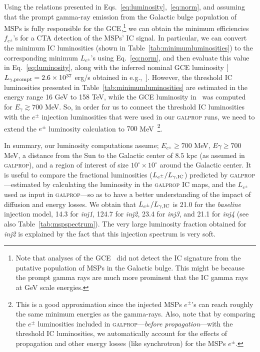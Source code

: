 \documentclass[doublespace,nopageskip]{VTthesis}
\begin{document}
 Using the relations presented in Eqs.~\ref{eq:luminosity},~\ref{eq:norm}, and assuming that the prompt gamma-ray emission from the Galactic bulge population of MSPs is fully responsible for the GCE,\footnote{Note that analyses of the  
 GCE~\citep{2016PhRvD..93j3004L} did not detect the IC signature from the putative population of MSPs in the Galactic bulge. This might be because the prompt gamma rays are much more prominent that the IC gamma rays at GeV scale energies.}  we can obtain the minimum efficiencies $f_{e^\pm}$'s for a CTA detection of the MSPs' IC signal. In particular, we can convert the minimum IC luminosities (shown in Table~\ref{tab:minimumluminosities}) to the corresponding minimum $L_{e^\pm}$'s using Eq.~\ref{eq:norm}, and then evaluate this value in  Eq.~\ref{eq:luminosity}, along with the inferred nominal GCE luminosity [$L_{\gamma, {\rm prompt}}=2.6\times 10^{37}$ erg/s obtained in e.g.,~\citet{2019JCAP...09..042M}]. However, the threshold IC luminosities presented in Table~\ref{tab:minimumluminosities} are estimated in the energy range 16 GeV to 158 TeV, while the GCE luminosity in~\citet{2019JCAP...09..042M} was computed for $E_{\gamma} \gtrsim 700$ MeV. So, in order for us to connect the threshold IC luminosities with the $e^\pm$ injection luminosities that were used in our \textsc{galprop} runs, we need to extend the $e^\pm$ luminosity calculation to $700$ MeV~\footnote{This is a good approximation since the injected MSPs $e^\pm$'s can reach roughly the same minimum energies as the gamma-rays. Also, note that by comparing the $e^\pm$ luminosities included in \textsc{galprop}---\textit{before propagation}---with the threshold IC luminosities, we automatically account for the effects of propagation and other energy losses (like synchrotron) for the MSPs $e^\pm$.}. 

In summary, our luminosity computations assume; $E_{e^\pm}\geq700$ MeV, $E{\gamma}\geq700$ MeV, a distance from the Sun to the Galactic center of $8.5$ kpc (as assumed in \textsc{galprop}), and a region of interest of size $10^\circ\times10^\circ$ around the Galactic center. It is useful to compare the fractional luminosities ($L_{e^\pm}/L_{\gamma, {\rm IC}}$) predicted by \textsc{galprop}---estimated by calculating the luminosity in the \textsc{galprop} IC maps, and the $L_{e^\pm}$ used as input in \textsc{galprop}---so as to have a better understanding of the impact of diffusion and energy losses. We obtain that $L_{e^\pm}/L_{\gamma, {\rm IC}}$ is 21.0 for the \textit{baseline} injection model, 14.3 for \textit{inj1}, 124.7 for \textit{inj2}, 23.4 for \textit{inj3}, and 21.1 for \textit{inj4} (see also Table~\ref{tab:mspspectrum}). The very large luminosity fraction obtained for \textit{inj2} is explained by the fact that this injection spectrum is very soft.       
\end{document}
